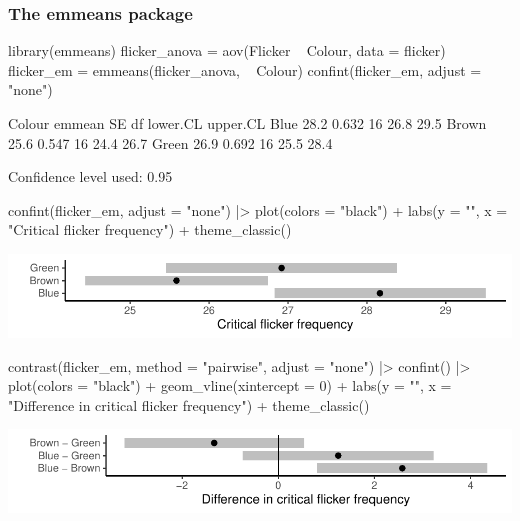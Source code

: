\documentclass[a4paper]{article}\usepackage[]{graphicx}\usepackage[]{xcolor}
\makeatletter
\def\maxwidth{ %
  \ifdim\Gin@nat@width>\linewidth
    \linewidth
  \else
    \Gin@nat@width
  \fi
}
\makeatother
\begin{document}
\subsubsection{The emmeans package}
\begin{Schunk}
\begin{Sinput}
library(emmeans)
flicker_anova = aov(Flicker ~ Colour, data = flicker)
flicker_em = emmeans(flicker_anova, ~ Colour)
confint(flicker_em, adjust = "none")
\end{Sinput}
\begin{Soutput}
 Colour emmean    SE df lower.CL upper.CL
 Blue     28.2 0.632 16     26.8     29.5
 Brown    25.6 0.547 16     24.4     26.7
 Green    26.9 0.692 16     25.5     28.4

Confidence level used: 0.95 
\end{Soutput}
\begin{Sinput}
confint(flicker_em, adjust = "none") |> plot(colors = "black") + 
  labs(y = "", x = "Critical flicker frequency") +
  theme_classic()
\end{Sinput}


{\centering \includegraphics[width=\maxwidth]{figure/listings-unnamed-chunk-246-1} 

}

\begin{Sinput}
contrast(flicker_em, method = "pairwise", adjust = "none") |> confint()  |> 
  plot(colors = "black") + geom_vline(xintercept = 0) + 
  labs(y = "", x = "Difference in critical flicker frequency") +
  theme_classic()
\end{Sinput}


{\centering \includegraphics[width=\maxwidth]{figure/listings-unnamed-chunk-246-2} 

}

\end{Schunk}
\end{document}
